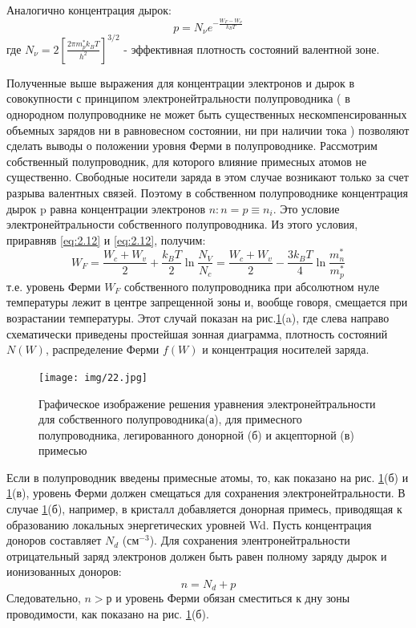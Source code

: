 Аналогично концентрация дырок: 
\begin{equation}
	p=N_{\nu} e^{-\frac{W_{F}-W_{\nu}}{k_{B} T}}
	\label{eq:2.13}
\end{equation}
где $N_{\nu}=2\left[\frac{2 \pi m_{p}^{*} k_{B} T}{h^{2}}\right]^{3 / 2}$ - эффективная плотность состояний валентной зоне.

Полученные выше выражения для концентрации электронов и дырок в совокупности с принципом электронейтральности
полупроводника ( в однородном полупроводнике не может быть существенных нескомпенсированных объемных зарядов ни в
равновесном состоянии, ни при наличии тока ) позволяют сделать выводы о положении уровня Ферми в полупроводнике.
Рассмотрим собственный полупроводник, для которого влияние примесных атомов не существенно. Свободные носители заряда в
этом случае возникают только за счет разрыва валентных связей. Поэтому в собственном полупроводнике концентрация дырок p
равна концентрации электронов $ n: n = p \equiv n_i$. Это условие электронейтральности собственного полупроводника. Из этого
условия, приравняв \eqref{eq:2.12} и \eqref{eq:2.12}, получим:
\begin{equation}
	W_{F}=\frac{W_{c}+W_{v}}{2}+\frac{k_{B} T}{2} \ln \frac{N_{V}}{N_{c}}=\frac{W_{c}+W_{v}}{2}-\frac{3 k_{B} T}{4} \ln \frac{m_{n}^{*}}{m_{p}^{*}}
	\label{eq:2.14}
\end{equation}
т.е. уровень Ферми $W_F$ собственного полупроводника при абсолютном нуле температуры лежит в центре запрещенной зоны и,
вообще говоря, смещается при возрастании температуры. Этот случай показан на рис.\ref{fig:2.1}(a), где слева направо схематически
приведены простейшая зонная диаграмма, плотность состояний $N(W)$, распределение Ферми $f (W)$ и концентрация носителей
заряда.


\begin{figure}[h!]
	\texttt{[image: img/22.jpg]}
	\caption{Графическое изображение решения уравнения электронейтральности для собственного полупроводника(а), для примесного полупроводника, легированного донорной (б) и акцепторной (в) примесью}
	\label{fig:2.1}
\end{figure}

Если в полупроводник введены примесные атомы, то, как показано на рис. \ref{fig:2.1}(б) и \ref{fig:2.1}(в), уровень Ферми должен смещаться для
сохранения электронейтральности. В случае \ref{fig:2.1}(б), например, в кристалл добавляется донорная примесь, приводящая к
образованию локальных энергетических уровней Wd. Пусть концентрация доноров составляет $N_d$ (см$^{-3}$). Для сохранения
элентронейтральности отрицательный заряд электронов должен быть равен полному заряду дырок и ионизованных доноров:
\begin{equation}
	n = N_d+p
	\label{eq:2.15}
\end{equation}
Следовательно, $n>р$ и уровень Ферми обязан сместиться к дну зоны проводимости, как показано на рис. \ref{fig:2.1}(б).

